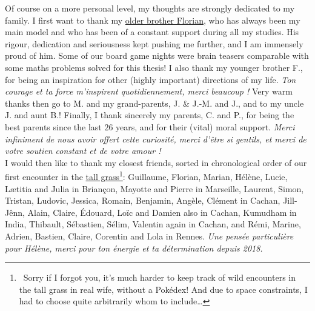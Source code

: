 \begin{acknowledgements}
Of course on a more personal level, my thoughts are strongly dedicated to my family.
%
I first want to thank my \href{https://paris-sorbonne.academia.edu/FBesson}{older brother Florian}, who has always been my main model and who has been of a constant support during all my studies.
His rigour, dedication and seriousness kept pushing me further, and I am immensely proud of him.
Some of our board game nights were brain teasers comparable with some maths problems solved for this thesis!
%
I also thank my younger brother F., for being an inspiration for other (highly important) directions of my life. \emph{Ton courage et ta force m'inspirent quotidiennement, merci beaucoup !}
Very warm thanks then go to M. and my grand-parents, J. \& J.-M. and J., and to my uncle J. and aunt B.!
Finally, I thank sincerely my parents, C. and P., for being the best parents since the last $26$ years, and for their (vital) moral support.
\emph{Merci infiniment de nous avoir offert cette curiosité, merci d'être si gentils, et merci de votre soutien constant et de votre amour !}
\\
\indent
I would then like to thank my closest friends, sorted in chronological order of our first encounter in the \href{https://bulbapedia.bulbagarden.net/wiki/Tall_grass}{tall grass}\footnote{~Sorry if I forgot you, it's much harder to keep track of wild encounters in the tall grass in real wife, without a Pokédex! And due to space constraints, I had to choose quite arbitrarily whom to include\dots}: Guillaume, Florian, Marian, Hélène, Lucie, Lætitia and Julia in Briançon, Mayotte and Pierre in Marseille, Laurent, Simon, Tristan, Ludovic, Jessica, Romain, Benjamin, Angèle, Clément in Cachan, Jill-Jênn, Alain, Claire, Édouard, Loïc and Damien also in Cachan, Kumudham in India, Thibault, Sébastien, Sélim, Valentin again in Cachan, and Rémi, Marine, Adrien, Bastien, Claire, Corentin and Lola in Rennes.
\emph{Une pensée particulière pour Hélène, merci pour ton énergie et ta détermination depuis 2018.}


\end{acknowledgements}
